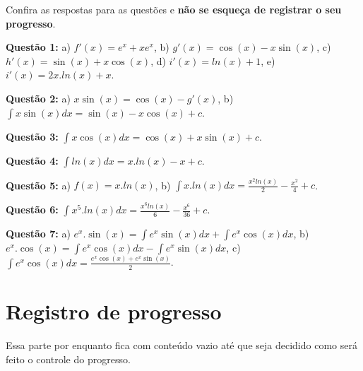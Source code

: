 \documentclass[main_estudante.tex]{subfiles}
\begin{document}
Confira as respostas para as questões e \textbf{não se esqueça de registrar o seu progresso}.

\noindent\textbf{Questão 1:} a) $f'(x)=e^x+xe^x$, b) $g'(x)=\cos(x)-x\sin(x)$, c) $h'(x)=\sin(x)+x\cos(x)$, d) $i'(x)=ln(x)+1$, e) $i'(x)=2x.ln(x)+x$.

\noindent\textbf{Questão 2:} a) $x\sin(x)=\cos(x)-g'(x)$, b) $\int x\sin(x) dx = \sin(x)-x\cos(x)+c$.

\noindent\textbf{Questão 3:} $\int x\cos(x) dx = \cos(x)+x\sin(x)+c$.

\noindent\textbf{Questão 4:} $\int ln(x) dx = x.ln(x)-x+c$.

\noindent\textbf{Questão 5:} a) $f(x)=x.ln(x)$, b) $\int x.ln(x) dx = \frac{x^2 ln(x)}{2}-\frac{x^2}{4}+c$.

\noindent\textbf{Questão 6:} $\int x^5.ln(x) dx = \frac{x^6 ln(x)}{6}-\frac{x^6}{36}+c$.

\noindent\textbf{Questão 7:} a) $e^x.\sin(x)= \int e^x\sin(x)dx + \int e^x\cos(x)dx$, b) $e^x.\cos(x)= \int e^x\cos(x)dx - \int e^x\sin(x)dx$, c) $\int e^x\cos(x)dx = \frac{e^x\cos(x)+e^x\sin(x)}{2}$.

\section{Registro de progresso}

Essa parte por enquanto fica com conteúdo vazio até que seja decidido como será feito o controle do progresso.

\vspace{5cm}
\end{document}
